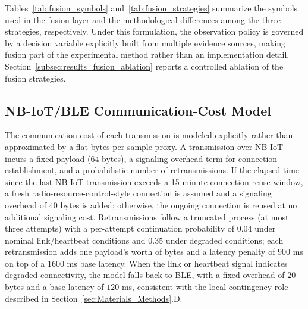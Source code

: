 \documentclass{ieeeaccess}
\begin{document}
Tables~\ref{tab:fusion_symbols} and~\ref{tab:fusion_strategies} summarize the symbols used in the fusion layer and the methodological differences among the three strategies, respectively. Under this formulation, the observation policy is governed by a decision variable explicitly built from multiple evidence sources, making fusion part of the experimental method rather than an implementation detail. Section~\ref{subsec:results_fusion_ablation} reports a controlled ablation of the fusion strategies.

\subsection{NB-IoT/BLE Communication-Cost Model}
\label{subsec:network_cost}
The communication cost of each transmission is modeled explicitly rather than approximated by a flat bytes-per-sample proxy. A transmission over NB-IoT incurs a fixed payload ($64$ bytes), a signaling-overhead term for connection establishment, and a probabilistic number of retransmissions. If the elapsed time since the last NB-IoT transmission exceeds a 15-minute connection-reuse window, a fresh radio-resource-control-style connection is assumed and a signaling overhead of $40$ bytes is added; otherwise, the ongoing connection is reused at no additional signaling cost. Retransmissions follow a truncated process (at most three attempts) with a per-attempt continuation probability of $0.04$ under nominal link/heartbeat conditions and $0.35$ under degraded conditions; each retransmission adds one payload's worth of bytes and a latency penalty of $900$ ms on top of a $1600$ ms base latency. When the link or heartbeat signal indicates degraded connectivity, the model falls back to BLE, with a fixed overhead of $20$ bytes and a base latency of $120$ ms, consistent with the local-contingency role described in Section~\ref{sec:Materials_Methods}.D.
\end{document}
